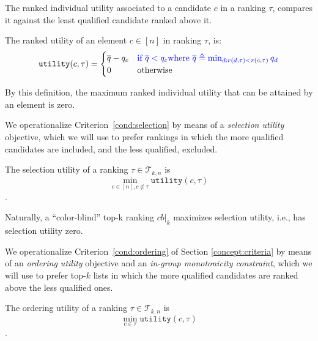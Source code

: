 The ranked individual utility associated to a candidate $c$ in a ranking $\tau$, compares it against the least qualified candidate ranked above it.

\begin{definition}
	\label{def:rankedIndividualFairness}
	The ranked utility of an element $c \in [n]$ in ranking $\tau$, is:
	\[
	\texttt{utility}(c,\tau) = \begin{cases}
	\overline{q} - q_c &\textcolor[rgb]{0.00,0.00,1.00}{ \textrm{if~} \overline{q} < q_c \textrm{where~} \overline{q}\triangleq \min_{d: r(d,\tau) < r(c,\tau)} q_d } \\
	0 & \textrm{otherwise}\\
	\end{cases}
	\]
\end{definition}
%
\noindent By this definition, the maximum ranked individual utility that can be attained by an element is zero. %
%

%
We operationalize Criterion~\ref{cond:selection} by means of a \emph{selection utility} objective, which we will use to prefer rankings in which the more qualified candidates are included, and the less qualified, excluded.
%
\begin{definition}
	\label{def:selectionFairness}
	The selection utility of a ranking
	$\tau \in {\mathcal T}_{k,n}$ is \[\min_{c \in [n], c \notin \tau} \texttt{utility}(c,\tau)\].
\end{definition}
%
\noindent Naturally, a ``color-blind'' top-k ranking $\textit{cb}|_k$ maximizes selection utility, i.e., has selection utility zero.

%
We operationalize Criterion~\ref{cond:ordering} of Section \ref{concept:criteria} by means of an \emph{ordering utility} objective and an \emph{in-group monotonicity constraint}, which we will use to prefer top-$k$ lists in which the more qualified candidates are ranked above the less qualified ones.

\begin{definition}
	\label{def:orderingFairness}
	The ordering utility of a ranking $\tau \in {\mathcal T}_{k,n}$ is \[\min_{c \in \tau} \texttt{utility}(c,\tau)\].
\end{definition}

